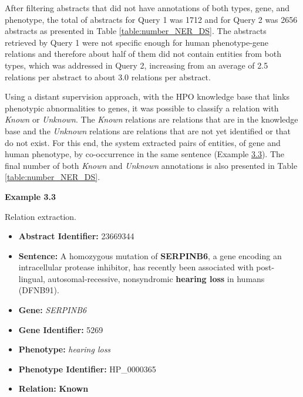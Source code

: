 After filtering abstracts that did not have annotations of both types, gene, and phenotype, the total of abstracts for Query 1 was 1712 and for Query 2 was 2656 abstracts as presented in Table \ref{table:number_NER_DS}. The abstracts retrieved by Query 1 were not specific enough for human phenotype-gene relations and therefore about half of them did not contain entities from both types, which was addressed in Query 2, increasing from an average of 2.5 relations per abstract to about 3.0 relations per abstract.

Using a distant supervision approach, with the HPO knowledge base that links phenotypic abnormalities to genes, it was possible to classify a relation with \textit{Known} or \textit{Unknown}. The \textit{Known} relations are relations that are in the knowledge base and the \textit{Unknown} relations are relations that are not yet identified or that do not exist. For this end, the system extracted pairs of entities, of gene and human phenotype, by co-occurrence in the same sentence (Example \hyperlink{ex3.3}{3.3}). The final number of both \textit{Known} and \textit{Unknown} annotations is also presented in Table \ref{table:number_NER_DS}.

\bigskip


\hypertarget{ex3.3}{\textbf{Example 3.3}} Relation extraction.

\begin{itemize}

\item\textbf{Abstract Identifier:} 23669344
\item\textbf{Sentence:} A homozygous mutation of \textbf{SERPINB6}, a gene encoding an intracellular protease inhibitor, has recently been associated with post-lingual, autosomal-recessive, nonsyndromic \textbf{hearing loss} in humans (DFNB91).
\item\textbf{Gene:} \textit{SERPINB6}
\item\textbf{Gene Identifier:} 5269
\item\textbf{Phenotype:} \textit{hearing loss}
\item\textbf{Phenotype Identifier:} HP\_0000365
\item\textbf{Relation:} \textbf{Known}

\end{itemize}



